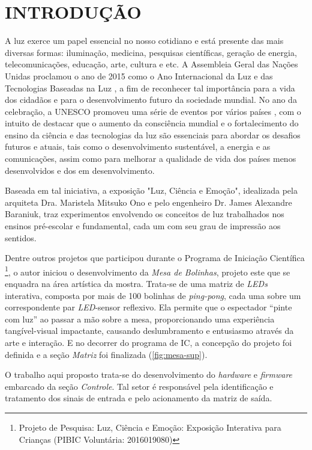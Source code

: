 
\chapter{INTRODUÇÃO}
\label{chap:introducao}

  A luz exerce um papel essencial no nosso cotidiano e está presente das mais diversas formas: iluminação, medicina, pesquisas científicas, geração de energia, telecomunicações, educação, arte, cultura e etc. A Assembleia Geral das Nações Unidas proclamou o ano de 2015 como o Ano Internacional da Luz e das Tecnologias Baseadas na Luz \cite{resolucao-onu}, a fim de reconhecer tal importância para a vida dos cidadãos e para o desenvolvimento futuro da sociedade mundial. No ano da celebração, a UNESCO promoveu uma série de eventos por vários países , com o intuito de destacar que o aumento da consciência mundial e o fortalecimento do ensino da ciência e das tecnologias da luz são essenciais para abordar os desafios futuros e atuais, tais como o desenvolvimento sustentável, a energia e as comunicações, assim como para melhorar a qualidade de vida dos países menos desenvolvidos e dos em desenvolvimento.
  
  Baseada em tal iniciativa, a exposição "Luz, Ciência e Emoção", idealizada pela arquiteta Dra. Maristela Mitsuko Ono e pelo engenheiro Dr. James Alexandre Baraniuk, traz experimentos envolvendo os conceitos de luz trabalhados nos ensinos pré-escolar e fundamental, cada um com seu grau de impressão aos sentidos.
  
  Dentre outros projetos que participou durante o Programa de Iniciação Científica \footnote{Projeto de Pesquisa: Luz, Ciência e Emoção: Exposição Interativa para Crianças (PIBIC Voluntária: 2016019080)}, o autor iniciou o desenvolvimento da \emph{Mesa de Bolinhas}, projeto este que se enquadra na área artística da mostra. Trata-se de uma matriz de \emph{LEDs} interativa, composta por mais de 100 bolinhas de \emph{ping-pong}, cada uma sobre um correspondente par \emph{LED}-sensor reflexivo. Ela permite que o espectador ``pinte com luz'' ao passar a mão sobre a mesa, proporcionando uma experiência tangível-visual impactante, causando deslumbramento e entusiasmo através da arte e interação. E no decorrer do programa de IC, a concepção do projeto foi definida e a seção \emph{Matriz} foi finalizada (\autoref{fig:mesa-sup}).
  
  O trabalho aqui proposto trata-se do desenvolvimento do \emph{hardware} e \emph{firmware} embarcado da seção \emph{Controle}. Tal setor é responsável pela identificação e tratamento dos sinais de entrada e pelo acionamento da matriz de saída.

